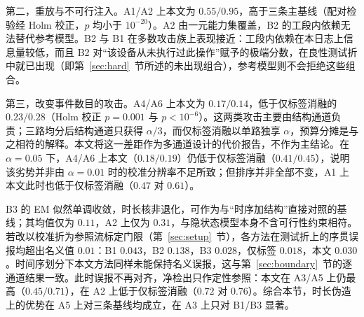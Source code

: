 \documentclass[manuscript,screen,review]{acmart}
\begin{document}
第二，重放与不可行注入。{A1}/{A2} 上本文为 $0.55/0.95$，高于三条主基线（配对检验经 Holm 校正，$p$ 均小于 $10^{-20}$）。{A2} 由一元能力集覆盖，{B2} 的工段内依赖无法替代参考模型。{B2} 与 {B1} 在多数攻击族上表现接近：工段内依赖在本日志上信息量较低，而且 {B2} 对``该设备从未执行过此操作''赋予的极端分数，在良性测试折中就已出现（即第~\ref{sec:hard}~节所述的未出现组合），参考模型则不会拒绝这些组合。

第三，改变事件数目的攻击。{A4}/{A6} 上本文为 $0.17/0.14$，低于仅标签消融的 $0.23/0.28$（Holm 校正 $p=0.001$ 与 $p<10^{-6}$）。这两类攻击主要由结构通道负责；三路均分后结构通道只获得 $\alpha/3$，而仅标签消融以单路独享 $\alpha$，预算分摊是与之相符的解释。本文将这一差距作为多通道设计的代价报告，不作为主结论。在 $\alpha=0.05$ 下，{A4}/{A6} 上本文（$0.18/0.19$）仍低于仅标签消融（$0.41/0.45$），说明该劣势并非由 $\alpha=0.01$ 时的校准分辨率不足所致；但排序并非全部不变，{A1} 上本文此时也低于仅标签消融（$0.47$ 对 $0.61$）。

{B3} 的 {EM} 似然单调收敛，时长核非退化，可作为与``时序加结构''直接对照的基线；其均值仅为 $0.11$，{A2} 上仅为 $0.31$，与隐状态模型本身不含可行性约束相符。若改以校准折为参照流标定门限（第~\ref{sec:setup}~节），各方法在测试折上的序贯误报均超出名义值 $0.01$：{B1} $0.043$，{B2} $0.138$，{B3} $0.028$，仅标签 $0.018$，本文 $0.030$。时间序划分下本文方法同样未能保持名义误报，这与第~\ref{sec:boundary}~节的逐通道结果一致。此时误报不再对齐，净检出只作定性参照：本文在 {A3}/{A5} 上仍最高（$0.45/0.71$），在 {A2} 上低于仅标签消融（$0.72$ 对 $0.76$）。综合本节，时长伪造上的优势在 {A5} 上对三条基线均成立，在 {A3} 上只对 {B1}/{B3} 显著。
\end{document}

